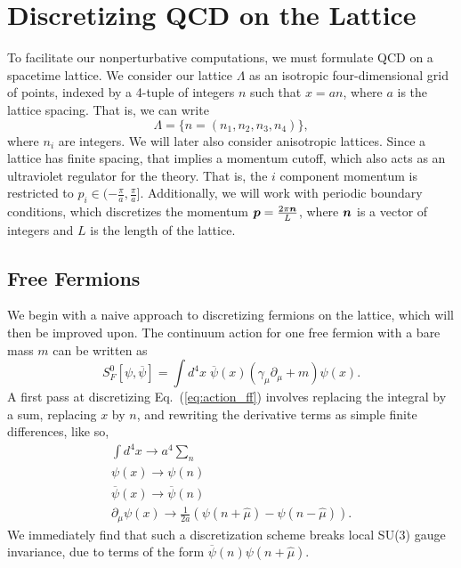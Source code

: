 \section{Discretizing QCD on the Lattice}
To facilitate our nonperturbative computations, we must formulate QCD on a spacetime lattice. We consider our lattice $\Lambda$ as an isotropic four-dimensional grid of points, indexed by a 4-tuple of integers $n$ such that $x=an$, where $a$ is the lattice spacing. That is, we can write
\begin{equation}
    \Lambda = \lbrace n = (n_1, n_2, n_3, n_4)\rbrace,
\end{equation}
where $n_i$ are integers. We will later also consider anisotropic lattices. Since a lattice has finite spacing, that implies a momentum cutoff, which also acts as an ultraviolet regulator for the theory. That is, the $i$ component momentum is restricted to $p_i \in (-\frac{\pi}{a}, \frac{\pi}{a}]$. Additionally, we will work with periodic boundary conditions, which discretizes the momentum $\boldsymbol{p} = \frac{2\pi \boldsymbol{n}}{L}$, where $\boldsymbol{n}$ is a vector of integers and $L$ is the length of the lattice. 
\subsection{Free Fermions}
We begin with a naive approach to discretizing fermions on the lattice, which will then be improved upon. The continuum action for one free fermion with a bare mass $m$ can be written as
\begin{equation}\label{eq:action_ff}
    S_{F}^{0}[\psi, \overline{\psi}]=\int d^{4} x \; \overline{\psi}(x)\left(\gamma_{\mu} \partial_{\mu}+m\right) \psi(x).
\end{equation}
A first pass at discretizing Eq.~(\ref{eq:action_ff}) involves replacing the integral by a sum, replacing $x$ by $n$, and rewriting the derivative terms as simple finite differences, like so,
\begin{gather}
    \int d^4x \rightarrow a^4 \sum_n \\
    \psi(x) \rightarrow \psi(n) \\
    \overline\psi(x) \rightarrow \overline\psi(n) \\
    \partial_{\mu} \psi(x) \rightarrow \frac{1}{2 a}(\psi(n+\hat{\mu})-\psi(n-\hat{\mu})).
\end{gather}
We immediately find that such a discretization scheme breaks local SU(3) gauge invariance, due to terms of the form $\overline\psi(n) \psi(n+\hat\mu)$.
